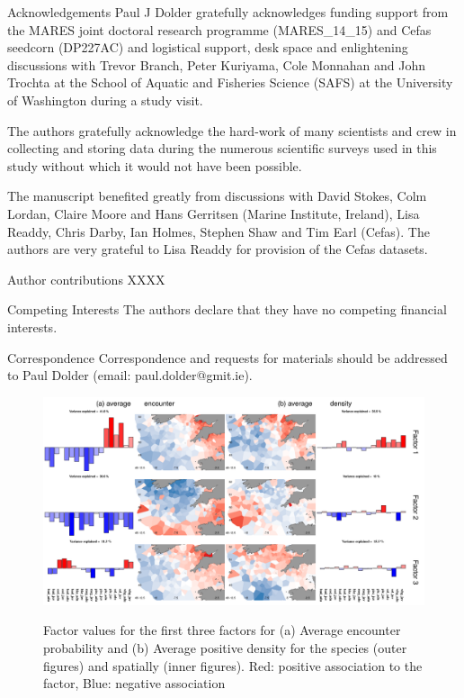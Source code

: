 \documentclass{nature}
\begin{document}
\begin{addendum}
 \item [Acknowledgements] Paul J Dolder gratefully acknowledges funding support
	 from the MARES joint doctoral research programme (MARES\_14\_15) and
	 Cefas seedcorn (DP227AC) and logistical support, desk space and
	 enlightening discussions with Trevor Branch, Peter Kuriyama, Cole
	 Monnahan and John Trochta at the School of Aquatic and Fisheries
	 Science (SAFS) at the University of Washington during a study visit.
	 
	 The authors gratefully acknowledge the hard-work of many scientists
	 and crew in collecting and storing data during the numerous scientific
	 surveys used in this study without which it would not have been
	 possible.  
	 
	 The manuscript benefited greatly from discussions with David Stokes,
	 Colm Lordan, Claire Moore and Hans Gerritsen (Marine Institute,
	 Ireland), Lisa Readdy, Chris Darby, Ian Holmes, Stephen Shaw and Tim
	 Earl (Cefas).  The authors are very grateful to Lisa Readdy for
	 provision of the Cefas datasets.

 \item[Author contributions] XXXX

 \item[Competing Interests] The authors declare that they have
	 no competing financial interests.
 \item[Correspondence] Correspondence and requests for materials
 should be addressed to Paul Dolder (email: paul.dolder@gmit.ie).
 \end{addendum}



\begin{figure}
\begin{center}
	\includegraphics[width=\linewidth]{"figures/Fig1_Combined"}
	\label{fig:1}
	\caption{Factor values for the first three factors for (a) Average
		encounter probability and (b) Average positive density for the
		species (outer figures) and spatially (inner figures).
		Red: positive association to the factor, Blue: negative
		association}
\end{center}
\end{figure}
\end{document}
